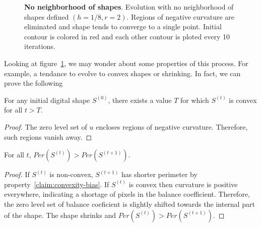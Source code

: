 \documentclass[smallextended]{svjour3}
\begin{document}
\begin{figure}
	\caption{\textbf{No neighborhood of shapes}. Evolution with no neighborhood of shapes defined $(h=1/8,r=2)$. Regions of negative curvature are eliminated and shape tends to converge to a single point. Initial contour is colored in red and each other contour is ploted every 10 iterations.}
	\label{fig:no-neighborhood-shapes-evolution}
\end{figure}

Looking at figure~\ref{fig:no-neighborhood-shapes-evolution}, we may wonder about some properties of this process. For example, a tendance to evolve to convex shapes or shrinking. In fact, we can prove the following

\begin{lemma}
\label{claim:convexity-bias} For any initial digital shape $S^{(0)}$, there exists a value $T$ for which $S^{(t)}$ is convex for all $t>T$.
\begin{proof}
The zero level set of $u$ encloses regions of negative curvature. Therefore, such regions vanish away.
\end{proof}
\end{lemma}

\begin{lemma}
\label{claim:shrinking-bias} For all $t$, $Per(S^{(t)}) > Per(S^{(t+1)})$.
\begin{proof}
If $S^{(t)}$ is non-convex, $S^{(t+1)}$ has shorter perimeter by property~\ref{claim:convexity-bias}. If $S^{(t)}$ is convex then curvature is positive everywhere, indicating a shortage of pixels in the balance coefficient. Therefore, the zero level set of balance coeficient is slightly shifted towards the internal part of the shape. The shape shrinks and $Per(S^{(t)}) > Per(S^{(t+1)})$.
\end{proof}
\end{lemma}
\end{document}
